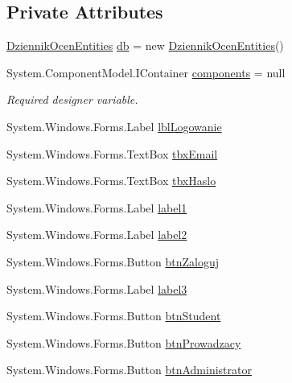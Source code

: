 \subsection*{Private Attributes}
\begin{DoxyCompactItemize}
\item 
\hyperlink{class_dziennik_ocen_1_1_dziennik_ocen_entities}{Dziennik\+Ocen\+Entities} \hyperlink{class_dziennik_ocen_1_1_form1_aeeaa17c2c70a1daae0e6f26f1fc788e6}{db} = new \hyperlink{class_dziennik_ocen_1_1_dziennik_ocen_entities}{Dziennik\+Ocen\+Entities}()
\item 
System.\+Component\+Model.\+I\+Container \hyperlink{class_dziennik_ocen_1_1_form1_a7b1d7b5c990e5a9bc92a1755cb4b5b58}{components} = null
\begin{DoxyCompactList}\small\item\em Required designer variable. \end{DoxyCompactList}\item 
System.\+Windows.\+Forms.\+Label \hyperlink{class_dziennik_ocen_1_1_form1_a21e8417347f7fbada2f5b5f5cde8c581}{lbl\+Logowanie}
\item 
System.\+Windows.\+Forms.\+Text\+Box \hyperlink{class_dziennik_ocen_1_1_form1_ac97730ed2eab3b9713c73112dc7417fb}{tbx\+Email}
\item 
System.\+Windows.\+Forms.\+Text\+Box \hyperlink{class_dziennik_ocen_1_1_form1_ae78ef2ccf550d5af060ea54cbc28077f}{tbx\+Haslo}
\item 
System.\+Windows.\+Forms.\+Label \hyperlink{class_dziennik_ocen_1_1_form1_ab1781ae675111e00fea84baf36b09b30}{label1}
\item 
System.\+Windows.\+Forms.\+Label \hyperlink{class_dziennik_ocen_1_1_form1_a3c5bd2259bef1a618510464d4377862d}{label2}
\item 
System.\+Windows.\+Forms.\+Button \hyperlink{class_dziennik_ocen_1_1_form1_aac2dedd2aeda7358bf65c5ed7a518ff3}{btn\+Zaloguj}
\item 
System.\+Windows.\+Forms.\+Label \hyperlink{class_dziennik_ocen_1_1_form1_a8bc43c594a39bdb51bb665861a585c6b}{label3}
\item 
System.\+Windows.\+Forms.\+Button \hyperlink{class_dziennik_ocen_1_1_form1_ad351dcf0c98815603b220c185d0f743d}{btn\+Student}
\item 
System.\+Windows.\+Forms.\+Button \hyperlink{class_dziennik_ocen_1_1_form1_a3e80414e3a1d2c92f9649e57e4c610a8}{btn\+Prowadzacy}
\item 
System.\+Windows.\+Forms.\+Button \hyperlink{class_dziennik_ocen_1_1_form1_a1bc9483c61d99951b6f2d57d24b4fe60}{btn\+Administrator}
\end{DoxyCompactItemize}


